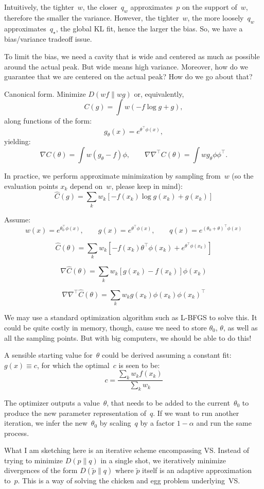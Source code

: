 \documentclass{article}
\begin{document}
Intuitively, the tighter~$w$, the closer~$q_w$ approximates~$p$ on the support of~$w$, therefore the smaller the variance. However, the tighter~$w$, the more loosely~$q_w$ approximates~$q_\star$, the global KL fit, hence the larger the bias. So, we have a bias/variance tradeoff issue.

To limit the bias, we need a cavity that is wide and centered as much as possible around the actual peak. But wide means high variance. Moreover, how do we guarantee that we are centered on the actual peak? How do we go about that?

Canonical form. Minimize $D(wf\|wg)$ or, equivalently,
$$
C(g) = \int w(-f \log g + g),
$$
along functions of the form:
$$
g_\theta(x) = e^{\theta^\top \phi(x)},
$$
yielding:
$$
\nabla C (\theta) = \int w (g_\theta-f) \phi,
\qquad
\nabla \nabla^\top C(\theta) = \int w g_\theta \phi\phi^\top.
$$

In practice, we perform approximate minimization by sampling from~$w$ (so the evaluation points $x_k$ depend on~$w$, please keep in mind):
$$
\hat{C}(g) = \sum_k w_k \left[
-f(x_k) \log g(x_k) + g(x_k)
\right]
$$

Assume:
$$
w(x) = e^{\theta_0^\top \phi(x)},
\qquad
g(x) = e^{\theta^\top \phi(x)},
\qquad
q(x) = e^{(\theta_0+\theta)^\top \phi(x)}
$$

$$
\hat{C}(\theta) = \sum_k w_k \left[
-f(x_k) \theta^\top\phi(x_k) + e^{\theta^\top \phi(x_k)}
\right]
$$

$$
\nabla \hat{C}(\theta) 
= \sum_k w_k 
[g(x_k) - f(x_k)] \phi(x_k)
$$

$$
\nabla\nabla^\top \hat{C}(\theta) 
= \sum_k w_k 
g(x_k) \phi(x_k)\phi(x_k)^\top
$$

We may use a standard optimization algorithm such as L-BFGS to solve this. It could be quite costly in memory, though, cause we need to store $\theta_0$, $\theta$, as well as all the sampling points. But with big computers, we should be able to do this!

A sensible starting value for~$\theta$ could be derived assuming a constant fit: $g(x)\equiv c$, for which the optimal~$c$ is seen to be:
$$
c = \frac{\sum_k w_k f(x_k)}{\sum_k w_k}
$$

The optimizer outputs a value~$\theta$, that needs to be added to the current~$\theta_0$ to produce the new parameter representation of~$q$. If we want to run another iteration, we infer the new~$\theta_0$ by scaling~$q$ by a factor $1-\alpha$ and run the same process.

What I am sketching here is an iterative scheme encompassing VS. Instead of trying to minimize $D(p\|q)$ in a single shot, we iteratively minimize divergences of the form $D(\tilde{p}\|q)$ where $\tilde{p}$ itself is an adaptive approximation to~$p$. This is a way of solving the chicken and egg problem underlying~VS. 
\end{document}
